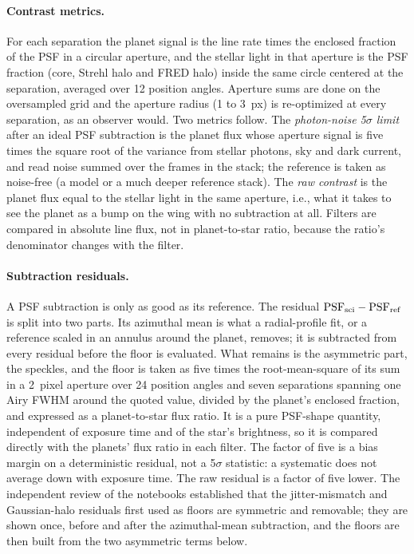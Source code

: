 \documentclass[11pt]{article}
\begin{document}
\paragraph{Contrast metrics.} For each separation the planet signal is the line rate times the enclosed fraction of the PSF in a circular aperture, and the stellar light in that aperture is the PSF fraction (core, Strehl halo and FRED halo) inside the same circle centered at the separation, averaged over 12 position angles. Aperture sums are done on the oversampled grid and the aperture radius (1 to 3~px) is re-optimized at every separation, as an observer would. Two metrics follow. The \emph{photon-noise 5$\sigma$ limit} after an ideal PSF subtraction is the planet flux whose aperture signal is five times the square root of the variance from stellar photons, sky and dark current, and read noise summed over the frames in the stack; the reference is taken as noise-free (a model or a much deeper reference stack). The \emph{raw contrast} is the planet flux equal to the stellar light in the same aperture, i.e., what it takes to see the planet as a bump on the wing with no subtraction at all. Filters are compared in absolute line flux, not in planet-to-star ratio, because the ratio's denominator changes with the filter.

\paragraph{Subtraction residuals.} A PSF subtraction is only as good as its reference. The residual ${\rm PSF}_{\rm sci} - {\rm PSF}_{\rm ref}$ is split into two parts. Its azimuthal mean is what a radial-profile fit, or a reference scaled in an annulus around the planet, removes; it is subtracted from every residual before the floor is evaluated. What remains is the asymmetric part, the speckles, and the floor is taken as five times the root-mean-square of its sum in a 2~pixel aperture over 24 position angles and seven separations spanning one Airy FWHM around the quoted value, divided by the planet's enclosed fraction, and expressed as a planet-to-star flux ratio. It is a pure PSF-shape quantity, independent of exposure time and of the star's brightness, so it is compared directly with the planets' flux ratio in each filter. The factor of five is a bias margin on a deterministic residual, not a 5$\sigma$ statistic: a systematic does not average down with exposure time. The raw residual is a factor of five lower. The independent review of the notebooks established that the jitter-mismatch and Gaussian-halo residuals first used as floors are symmetric and removable; they are shown once, before and after the azimuthal-mean subtraction, and the floors are then built from the two asymmetric terms below.
\end{document}
